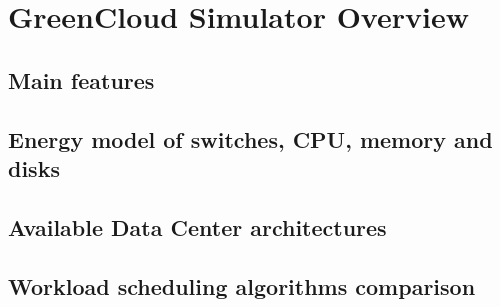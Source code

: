 \chapter{GreenCloud Simulator Overview}

\begin{citazione}

\end{citazione}
\newpage

\section{Main features} 

\section{Energy model of switches, CPU, memory and disks}

\section{Available Data Center architectures}

\section{Workload scheduling algorithms comparison} 
    
